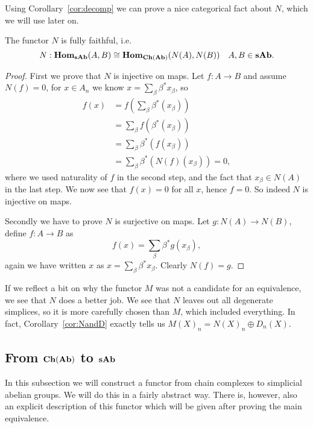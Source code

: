 Using Corollary~\ref{cor:decomp} we can prove a nice categorical fact about $N$, which we will use later on.
\begin{lemma}
	\label{le:fullyfaithful}
	The functor $N$ is fully faithful, i.e.
	$$ N: \mathbf{Hom}_{\mathbf{sAb}}(A, B) \cong \mathbf{Hom}_{\mathbf{Ch}(\mathbf{Ab})}(N(A), N(B)) \quad A, B \in \mathbf{sAb}. $$
\end{lemma}
\begin{proof}
	First we prove that $N$ is injective on maps. Let $f: A \to B$ and assume $N(f) = 0$, for $x \in A_n$ we know $x = \sum_\beta \beta^\ast x_\beta$, so
	\begin{align*}
		f(x) &= \textstyle f(\sum_\beta \beta^\ast (x_\beta)) \\
			&= \textstyle \sum_\beta f(\beta^\ast (x_\beta)) \\ 
			&= \textstyle \sum_\beta \beta^\ast (f (x_\beta)) \\ 
			&= \textstyle \sum_\beta \beta^\ast (N(f) (x_\beta)) = 0,	
	\end{align*}
	where we used naturality of $f$ in the second step, and the fact that $x_\beta \in N(A)$ in the last step. We now see that $f(x) = 0$ for all $x$, hence $f = 0$. So indeed $N$ is injective on maps.

	Secondly we have to prove $N$ is surjective on maps. Let $g: N(A) \to N(B)$, define $f: A \to B$ as
	$$ f(x) = \sum_\beta \beta^\ast g(x_\beta), $$
	again we have written $x$ as $x = \sum_\beta \beta^\ast x_\beta$. Clearly $N(f) = g$.
\end{proof}

If we reflect a bit on why the functor $M$ was not a candidate for an equivalence, we see that $N$ does a better job. We see that $N$ leaves out all degenerate simplices, so it is more carefully chosen than $M$, which included everything. In fact, Corollary~\ref{cor:NandD} exactly tells us $M(X)_n = N(X)_n \oplus D_n(X)$.


\subsection{From $\mathbf{Ch}(\mathbf{Ab})$ to $\mathbf{sAb}$}
In this subsection we will construct a functor from chain complexes to simplicial abelian groups. We will do this in a fairly abstract way. There is, however, also an explicit description of this functor which will be given after proving the main equivalence.

